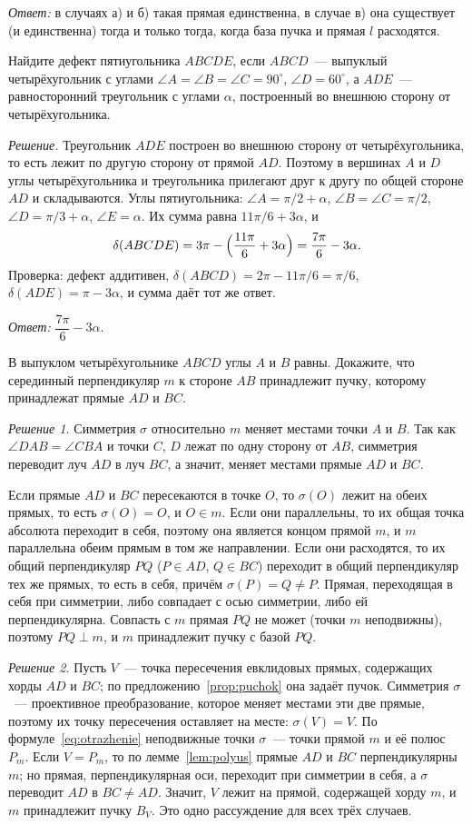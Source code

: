\textit{Ответ:} в случаях а) и б) такая прямая единственна, в случае в) она существует (и единственна) тогда и только тогда, когда база пучка и прямая $l$ расходятся.

\begin{task}
Найдите дефект пятиугольника $ABCDE$, если $ABCD$~--- выпуклый четырёхугольник с углами $\angle A=\angle B=\angle C=90^\circ$, $\angle D=60^\circ$, а $ADE$~--- равносторонний треугольник с углами $\alpha$, построенный во внешнюю сторону от четырёхугольника.
\end{task}
\textit{Решение.} Треугольник $ADE$ построен во внешнюю сторону от четырёхугольника, то есть лежит по другую сторону от прямой $AD$. Поэтому в вершинах $A$ и $D$ углы четырёхугольника и треугольника прилегают друг к другу по общей стороне $AD$ и складываются. Углы пятиугольника: $\angle A=\pi/2+\alpha$, $\angle B=\angle C=\pi/2$, $\angle D=\pi/3+\alpha$, $\angle E=\alpha$. Их сумма равна $11\pi/6+3\alpha$, и
\[
\delta(ABCDE)=3\pi-\Bigl(\frac{11\pi}6+3\alpha\Bigr)=\frac{7\pi}6-3\alpha.
\]
Проверка: дефект аддитивен, $\delta(ABCD)=2\pi-11\pi/6=\pi/6$, $\delta(ADE)=\pi-3\alpha$, и сумма даёт тот же ответ.

\textit{Ответ:} $\dfrac{7\pi}{6}-3\alpha$.

\begin{task}
В выпуклом четырёхугольнике $ABCD$ углы $A$ и $B$ равны. Докажите, что серединный перпендикуляр $m$ к стороне $AB$ принадлежит пучку, которому принадлежат прямые $AD$ и $BC$.
\end{task}
\textit{Решение 1.} Симметрия $\sigma$ относительно $m$ меняет местами точки $A$ и $B$. Так как $\angle DAB=\angle CBA$ и точки $C$, $D$ лежат по одну сторону от $AB$, симметрия переводит луч $AD$ в луч $BC$, а значит, меняет местами прямые $AD$ и $BC$.

Если прямые $AD$ и $BC$ пересекаются в точке $O$, то $\sigma(O)$ лежит на обеих прямых, то есть $\sigma(O)=O$, и $O\in m$. Если они параллельны, то их общая точка абсолюта переходит в себя, поэтому она является концом прямой $m$, и $m$ параллельна обеим прямым в том же направлении. Если они расходятся, то их общий перпендикуляр $PQ$ ($P\in AD$, $Q\in BC$) переходит в общий перпендикуляр тех же прямых, то есть в себя, причём $\sigma(P)=Q\ne P$. Прямая, переходящая в себя при симметрии, либо совпадает с осью симметрии, либо ей перпендикулярна. Совпасть с $m$ прямая $PQ$ не может (точки $m$ неподвижны), поэтому $PQ\perp m$, и $m$ принадлежит пучку с базой $PQ$.

\textit{Решение 2.} Пусть $V$~--- точка пересечения евклидовых прямых, содержащих хорды $AD$ и $BC$; по предложению~\ref{prop:puchok} она задаёт пучок. Симметрия $\sigma$~--- проективное преобразование, которое меняет местами эти две прямые, поэтому их точку пересечения оставляет на месте: $\sigma(V)=V$. По формуле~\eqref{eq:otrazhenie} неподвижные точки $\sigma$~--- точки прямой $m$ и её полюс $P_m$. Если $V=P_m$, то по лемме~\ref{lem:polyus} прямые $AD$ и $BC$ перпендикулярны $m$; но прямая, перпендикулярная оси, переходит при симметрии в себя, а $\sigma$ переводит $AD$ в $BC\ne AD$. Значит, $V$ лежит на прямой, содержащей хорду $m$, и $m$ принадлежит пучку $B_V$. Это одно рассуждение для всех трёх случаев.

